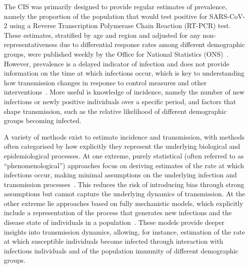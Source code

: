 \documentclass[9pt,twocolumn,twoside]{pnas-new}
\begin{document}
The CIS was primarily designed to provide regular estimates of prevalence, namely the proportion of the population that would test positive for SARS-CoV-2 using a Reverse Transcription Polymerase Chain Reaction (RT-PCR) test. These estimates, stratified by age and region and adjusted for any non-representativeness due to differential response rates among different demographic groups, were published weekly by the Office for National Statistics (ONS)~\citep{pouwelsCommunity,pouwelsMRPvaccination,cisMethodsONS,onsCISdec2020}.
However, prevalence is a delayed indicator of infection and does not provide information on the time at which infections occur, which is key to understanding how transmission changes in response to control measures and other interventions~\citep{hallettEstimating}.
More useful is knowledge of incidence, namely the number of new infections or newly positive individuals over a specific period, and factors that shape transmission, such as the relative likelihood of different demographic groups becoming infected.


A variety of methods exist to estimate incidence and transmission, with methods often categorised by how explicitly they represent the underlying biological and epidemiological processes. At one extreme, purely statistical (often referred to as ``phenomenological'') approaches focus on deriving estimates of the rate at which infections occur, making minimal assumptions on the underlying infection and transmission processes~\citep{beckerCOVIDmodels,garnettMathematical}.
This reduces the risk of introducing bias through strong assumptions but cannot capture the underlying dynamics of transmission. At the other extreme lie approaches based on fully mechanistic models, which explicitly include a representation of the process that generates new infections and the disease state of individuals in a population~\citep{andersonInfectious,keelingModeling}.
These models provide deeper insights into transmission dynamics, allowing, for instance, estimation of the rate at which susceptible individuals become infected through interaction with infectious individuals and of the population immunity of different demographic groups.
\end{document}
